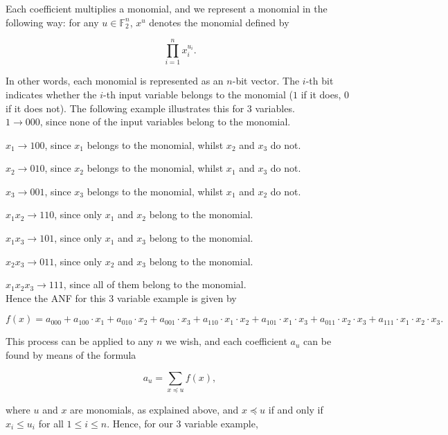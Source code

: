 \documentclass{report}
\begin{document}
Each coefficient multiplies a monomial, and we represent a monomial in the following way: for any $u \in \mathbb{F}^n_2$, $x^u$ denotes the monomial defined by

\begin{equation*}
    \prod_{i = 1}^{n} x_i^{u_i}.
\end{equation*}

In other words, each monomial is represented as an $n$-bit vector. The $i$-th bit indicates whether the $i$-th input variable belongs to the monomial ($1$ if it does, $0$ if it does not). The following example illustrates this for $3$ variables.\\

$1 \rightarrow 000$, since none of the input variables belong to the monomial.

$x_1 \rightarrow 100$, since $x_1$ belongs to the monomial, whilst $x_2$ and $x_3$ do not.

$x_2 \rightarrow 010$, since $x_2$ belongs to the monomial, whilst $x_1$ and $x_3$ do not.

$x_3 \rightarrow 001$, since $x_3$ belongs to the monomial, whilst $x_1$ and $x_2$ do not.

$x_1x_2 \rightarrow 110$, since only $x_1$ and $x_2$ belong to the monomial.

$x_1x_3 \rightarrow 101$, since only $x_1$ and $x_3$ belong to the monomial.

$x_2x_3 \rightarrow 011$, since only $x_2$ and $x_3$ belong to the monomial.

$x_1x_2x_3 \rightarrow 111$, since all of them belong to the monomial.\\

Hence the ANF for this 3 variable example is given by

\begin{equation*}
    f(x) = a_{000} + a_{100} \cdot x_1 + a_{010} \cdot x_2 + a_{001} \cdot x_3 + a_{110} \cdot x_1 \cdot x_2 + a_{101} \cdot x_1  \cdot x_3 + a_{011} \cdot x_2 \cdot x_3 + a_{111} \cdot x_1 \cdot x_2 \cdot x_3.
\end{equation*}

This process can be applied to any $n$ we wish, and each coefficient $a_u$ can be found by means of the formula

\begin{equation*}
    a_u = \sum_{x \preceq u} f(x),
\end{equation*}

where $u$ and $x$ are monomials, as explained above, and $x \preceq u$ if and only if $x_i \leq u_i$ for all $1 \leq i \leq n$. Hence, for our 3 variable example,
\end{document}
